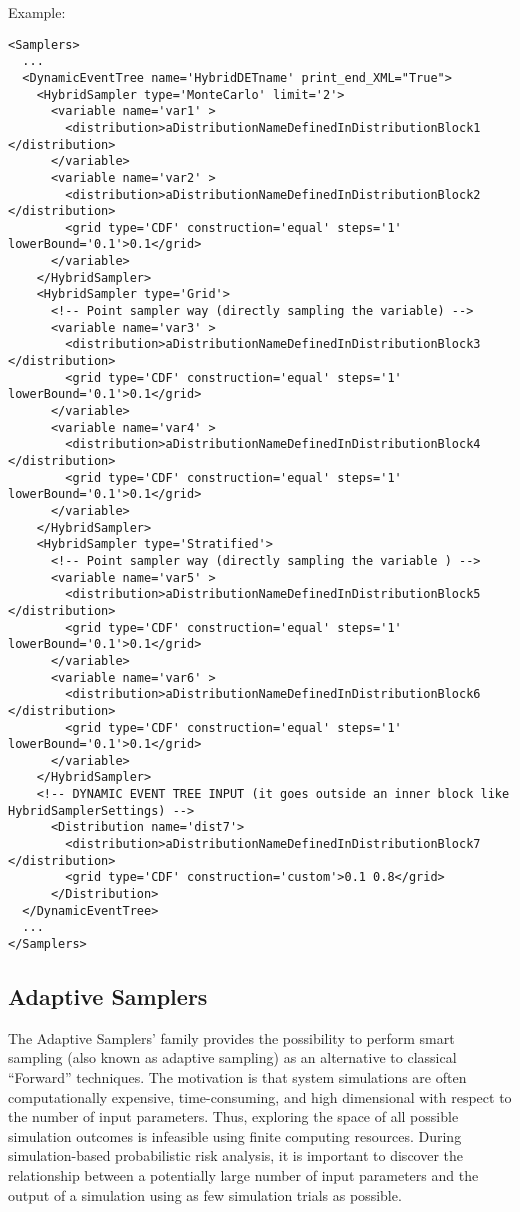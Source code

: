 Example:
\begin{lstlisting}[style=XML]
<Samplers>
  ...
  <DynamicEventTree name='HybridDETname' print_end_XML="True">
    <HybridSampler type='MonteCarlo' limit='2'>
      <variable name='var1' >
        <distribution>aDistributionNameDefinedInDistributionBlock1 </distribution>
      </variable>
      <variable name='var2' >
        <distribution>aDistributionNameDefinedInDistributionBlock2 </distribution>
        <grid type='CDF' construction='equal' steps='1' lowerBound='0.1'>0.1</grid>
      </variable>
    </HybridSampler>
    <HybridSampler type='Grid'>
      <!-- Point sampler way (directly sampling the variable) -->
      <variable name='var3' >
        <distribution>aDistributionNameDefinedInDistributionBlock3 </distribution>
        <grid type='CDF' construction='equal' steps='1' lowerBound='0.1'>0.1</grid>
      </variable>
      <variable name='var4' >
        <distribution>aDistributionNameDefinedInDistributionBlock4 </distribution>
        <grid type='CDF' construction='equal' steps='1' lowerBound='0.1'>0.1</grid>
      </variable>
    </HybridSampler>
    <HybridSampler type='Stratified'>
      <!-- Point sampler way (directly sampling the variable ) -->
      <variable name='var5' >
        <distribution>aDistributionNameDefinedInDistributionBlock5 </distribution>
        <grid type='CDF' construction='equal' steps='1' lowerBound='0.1'>0.1</grid>
      </variable>
      <variable name='var6' >
        <distribution>aDistributionNameDefinedInDistributionBlock6 </distribution>
        <grid type='CDF' construction='equal' steps='1' lowerBound='0.1'>0.1</grid>
      </variable>
    </HybridSampler>
    <!-- DYNAMIC EVENT TREE INPUT (it goes outside an inner block like HybridSamplerSettings) -->
      <Distribution name='dist7'>
        <distribution>aDistributionNameDefinedInDistributionBlock7 </distribution>
        <grid type='CDF' construction='custom'>0.1 0.8</grid>
      </Distribution>
  </DynamicEventTree>
  ...
</Samplers>
\end{lstlisting}

\subsection{Adaptive Samplers}
\label{subsec:AdaptSamplers}
The Adaptive Samplers' family provides the possibility to perform smart sampling
(also known as adaptive sampling) as an alternative to classical “Forward”
techniques.
%
The motivation is that system simulations are often computationally expensive,
time-consuming, and high dimensional with respect to the number of input
parameters.
%
Thus, exploring the space of all possible simulation outcomes is infeasible
using finite computing resources.
%
During simulation-based probabilistic risk analysis, it is important to discover
the relationship between a potentially large number of input parameters and the
output of a simulation using as few simulation trials as possible.

